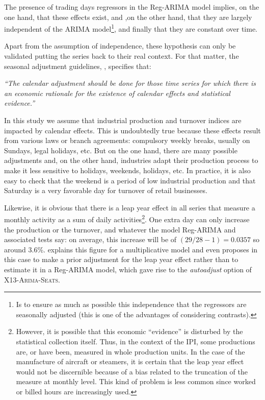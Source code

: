 \documentclass[12pt, a4paper]{article}
\begin{document}
The presence of trading days regressors in the Reg-ARIMA model implies, on the one hand, that these effects exist, and ,on the other hand, that they are largely independent of the ARIMA model\footnote{Is to ensure as much as possible this independence that the regressors are seasonally adjusted (this is one of the advantages of considering contrasts).}, and finally that they are constant over time.

Apart from the assumption of independence, these hypothesis can only be validated putting the series back  to their real context. For that matter, the seasonal adjustment guidelines, \cite{E2015}, specifies that:

{\it ``The calendar adjustment should be done for those time series for which there is an economic rationale for the existence of calendar effects and statistical evidence.''}

In this study we assume that industrial production and turnover indices are impacted by calendar effects. This is undoubtedly true because these effects result from various laws or branch agreements: compulsory weekly breaks, usually on Sundays, legal holidays, etc. But on the one hand, there are many possible adjustments and, on the other hand, industries adapt their production process to make it less sensitive to holidays, weekends, holidays, etc. In practice, it is also easy to check that the weekend is a period of low industrial production and that Saturday is a very favorable day for turnover of retail businesses.

Likewise, it is obvious that there is a leap year effect in all series that measure a monthly activity as a sum of daily activities\footnote{However, it is possible that this economic ``evidence'' is disturbed by the statistical collection itself. Thus, in the context of the IPI, some productions are, or have been, measured in whole production units. In the case of the manufacture of aircraft or steamers, it is certain that the leap year effect would not be discernible because of a bias related to the truncation of the measure at monthly level. This kind of problem is less common since worked or billed hours are increasingly used.}. One extra day can only increase the production or the turnover, and whatever the model Reg-ARIMA and associated tests say: on average, this increase will be of $(29/28 - 1) =  0.0357$ so around 3.6\%. \cite{B1992} explains this figure for a multiplicative model and even proposes in this case to make a prior adjustment for the leap year effect rather than to estimate it in a Reg-ARIMA model, which gave rise to the \emph{autoadjust} option of \textsc{X13-Arima-Seats}.
\end{document}
